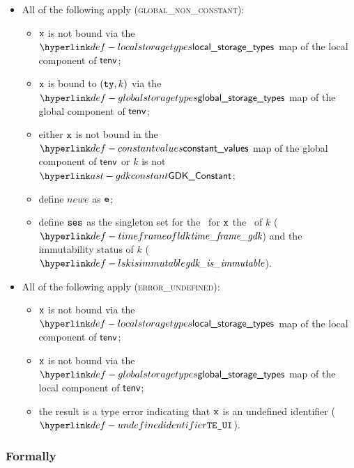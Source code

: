 \begin{itemize}
\begin{itemize}
    \item All of the following apply (\textsc{global\_non\_constant}):
    \begin{itemize}
      \item $\vx$ is not bound via the $\localstoragetypes$ map of the local component of $\tenv$;
      \item $\vx$ is bound to $(\tty, k)$ via the $\globalstoragetypes$ map of the global component of $\tenv$;
      \item either $\vx$ is not bound in the $\constantvalues$ map of the global component of $\tenv$ or $k$ is not $\GDKConstant$;
      \item define $newe$ as $\ve$;
      \item define $\vses$ as the singleton set for the \ReadGlobalTerm\ for $\vx$ the \timeframeterm\ of
            $k$ ($\timeframeofgdk$) and the immutability status of $k$ ($\gdkisimmutable$).
    \end{itemize}

    \item All of the following apply (\textsc{error\_undefined}):
    \begin{itemize}
      \item $\vx$ is not bound via the $\localstoragetypes$ map of the local component of $\tenv$;
      \item $\vx$ is not bound via the $\globalstoragetypes$ map of the local component of $\tenv$;
      \item the result is a type error indicating that $\vx$ is an undefined identifier ($\UndefinedIdentifier$).
    \end{itemize}
  \end{itemize}
\end{itemize}

\subsubsection{Formally}
\begin{mathpar}
\end{mathpar}

\begin{mathpar}
\end{mathpar}

